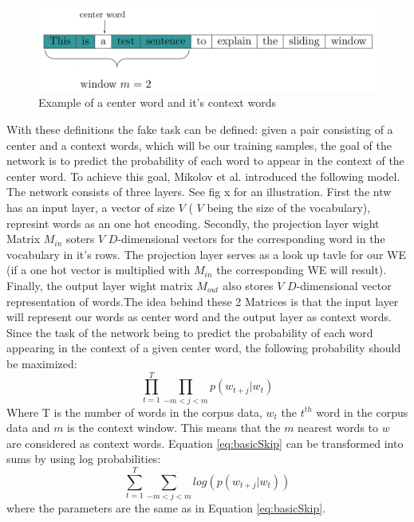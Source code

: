 \begin{figure}[h]
\centering
\includegraphics[scale=0.18]{images/window_ex}
\caption{Example of a center word and it's context words}
\label{fig:window_ex}
\end{figure}
With these definitions the fake task can be defined: given a pair consisting of a center and a context words, which will be our training samples, the goal of the network is to predict the probability of each word to appear in the context of the center word. To achieve this goal, Mikolov et al. introduced the following model. The network consists of three layers. See fig x for an illustration. First the ntw has an input layer, a vector of size $V$ ( $V$ being the size of the vocabulary), represint words as an one hot encoding. Secondly, the projection layer wight Matrix $M_{in}$ soters $V$ $D$-dimensional vectors for the corresponding word in the vocabulary  in it's rows. The projection layer serves as a look up tavle for our WE (if a one hot vector is multiplied with $M_{in}$ the corresponding WE will result). Finally, the output layer wight matrix $M_{out}$ also stores $V$ $D$-dimensional vector representation of words.The idea behind these 2 Matrices is that the input layer will represent our words as center word and the output layer as context words. Since the task of the network being to predict the probability of each word appearing in the context of a given center word, the following probability should be maximized:\\
\begin{equation} \label{eq:basicSkip}
\prod_{t=1}^T \prod_{-m<j<m} p(w_{t+j}|w_t)
\end{equation}
Where T is the number of words in the corpus data, $w_t$ the $t^{th}$ word in the corpus data and $m$ is the context window. This means that the $m$ nearest words to $w$ are considered as context words.
Equation \ref{eq:basicSkip} can be transformed into sums by using log probabilities:
\begin{equation}
\sum _{t=1}^T \sum_{-m<j<m} log( p(w_{t+j}|w_t) )
\end{equation}
where the parameters are the same as in Equation \ref{eq:basicSkip}.

